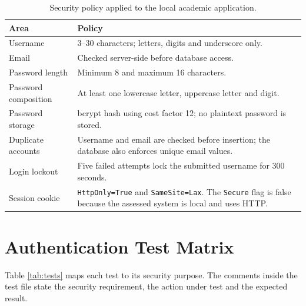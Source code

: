 \documentclass[11pt,a4paper]{article}
\begin{document}
\begin{table}[h]
\centering
\begin{tabularx}{\textwidth}{@{}lY@{}}
\toprule
\textbf{Area} & \textbf{Policy} \\
\midrule
Username & 3--30 characters; letters, digits and underscore only. \\
Email & Checked server-side before database access. \\
Password length & Minimum 8 and maximum 16 characters. \\
Password composition & At least one lowercase letter, uppercase letter and digit. \\
Password storage & bcrypt hash using cost factor 12; no plaintext password is stored. \\
Duplicate accounts & Username and email are checked before insertion; the database
also enforces unique email values. \\
Login lockout & Five failed attempts lock the submitted username for 300 seconds. \\
Session cookie & \texttt{HttpOnly=True} and \texttt{SameSite=Lax}. The \texttt{Secure}
flag is false because the assessed system is local and uses HTTP. \\
\bottomrule
\end{tabularx}
\caption{Security policy applied to the local academic application.}
\end{table}

\section{Authentication Test Matrix}

Table \ref{tab:tests} maps each test to its security purpose. The comments inside
the test file state the security requirement, the action under test and the
expected result.
\end{document}
